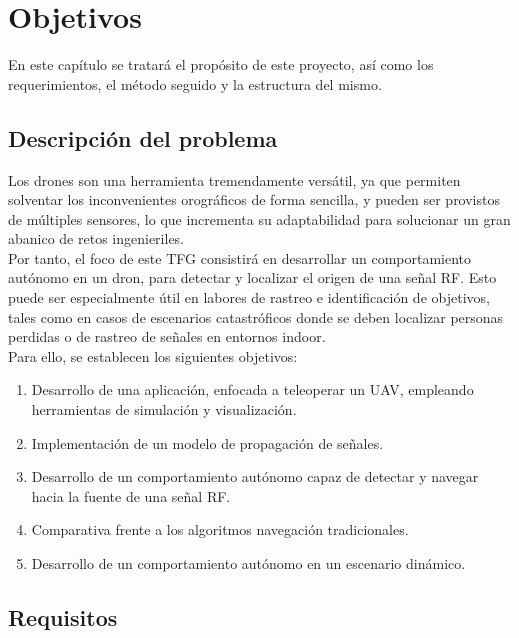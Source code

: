 \chapter{Objetivos}
\label{cap:capitulo2}

En este capítulo se tratará el propósito de este proyecto, así como los requerimientos, el método seguido y la estructura del mismo.\\

\section{Descripción del problema}
\label{sec:descripcion_problema}

Los drones son una herramienta tremendamente versátil, ya que permiten solventar los inconvenientes orográficos de forma sencilla, y pueden ser provistos de múltiples sensores, lo que incrementa su adaptabilidad para solucionar un gran abanico de retos ingenieriles.\\

Por tanto, el foco de este \ac{TFG} consistirá en desarrollar un comportamiento autónomo en un dron, para detectar y localizar el origen de una señal \ac{RF}. Esto puede ser especialmente útil en labores de rastreo e identificación de objetivos, tales como en casos de escenarios catastróficos donde se deben localizar personas perdidas o de rastreo de señales en entornos indoor.\\

Para ello, se establecen los siguientes objetivos:

\begin{enumerate}
	\item Desarrollo de una aplicación, enfocada a teleoperar un \ac{UAV}, empleando herramientas de simulación y visualización.
	\item Implementación de un modelo de propagación de señales.
	\item Desarrollo de un comportamiento autónomo capaz de detectar y navegar hacia la fuente de una señal \ac{RF}.
	\item Comparativa frente a los algoritmos navegación tradicionales.
	\item Desarrollo de un comportamiento autónomo en un escenario dinámico.
\end{enumerate}

\section{Requisitos}
\label{sec:requisitos}

